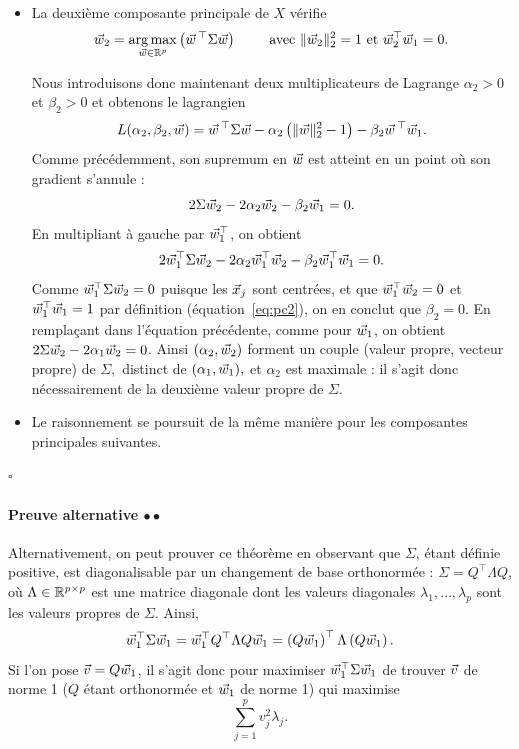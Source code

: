 \begin{itemize}
\item La deuxième composante principale de $X$ vérifie
\begin{equation}
  \label{eq:pc2}
  \ww_2 = \argmax_{\ww \in \RR^p} \left( \ww^\top \Sigma \ww \right) \text{ \qquad avec } \ltwonorm{\ww_2}^2=1
  \text{ et } \ww_2^\top\ww_1=0.
\end{equation}

Nous introduisons donc maintenant deux multiplicateurs de Lagrange
$\alpha_2 > 0$ et $\beta_2 > 0$ et obtenons le lagrangien
\begin{equation*}
  L(\alpha_2, \beta_2, \ww) = \ww^\top \Sigma \ww - \alpha_2 
  \left(\ltwonorm{\ww}^2 - 1 \right)
  - \beta_2 \ww^\top\ww_1.
\end{equation*}
Comme précédemment, son supremum en $\ww$ est atteint en un point où son
gradient s'annule :
\begin{equation*}
  2 \Sigma \ww_2 - 2 \alpha_2 \ww_2 - \beta_2 \ww_1 = 0.
\end{equation*}
En multipliant à gauche par $\ww_1^\top$, on obtient
\begin{equation*}
  2 \ww_1^\top \Sigma \ww_2 - 2 \alpha_2 \ww_1^\top \ww_2 - 
  \beta_2 \ww_1^\top \ww_1 = 0.
\end{equation*}
Comme $\ww_1^\top \Sigma \ww_2 = 0$ puisque les $\xx_j$ sont centrées, et que
$\ww_1^\top \ww_2 = 0$ et $\ww_1^\top \ww_1 = 1$ par définition
(équation~\eqref{eq:pc2}), on en conclut que $\beta_2=0.$ En remplaçant dans
l'équation précédente, comme pour $\ww_1$, on obtient
$2 \Sigma \ww_2 - 2 \alpha_1 \ww_2 = 0$.  Ainsi $(\alpha_2, \ww_2)$ forment un
couple (valeur propre, vecteur propre) de $\Sigma,$ distinct de
$(\alpha_1, \ww_1),$ et $\alpha_2$ est maximale : il s'agit donc nécessairement
de la deuxième valeur propre de $\Sigma$.
    
\item Le raisonnement se poursuit de la même manière pour les composantes principales
  suivantes.
\end{itemize}
\hfill $\square$

  
\paragraph{Preuve alternative  $\bullet\bullet$} Alternativement, on peut prouver ce théorème
en observant que $\Sigma$, étant définie positive, est
diagonalisable par un changement de base orthonormée :
$\Sigma = Q^\top \Lambda Q$, où $\Lambda \in \mathbb{R}^{p \times p}$ est une
matrice diagonale dont les valeurs diagonales $\lambda_1,\dots,\lambda_p$ sont les valeurs propres de
$\Sigma$.  Ainsi,
\begin{equation*}
  \ww_1^\top \Sigma \ww_1 = \ww_1^\top Q^\top \Lambda Q \ww_1 = 
  \left(Q \ww_1 \right)^\top \Lambda \left(Q \ww_1 \right).
\end{equation*}
Si l'on pose $\vv = Q \ww_1$, il s'agit donc pour maximiser
$\ww_1^\top \Sigma \ww_1$ de trouver $\vv$ de norme 1 ($Q$ étant orthonormée et
$\ww_1$ de norme 1) qui maximise
\[\sum_{j=1}^p v_j^2 \lambda_j.\]  

